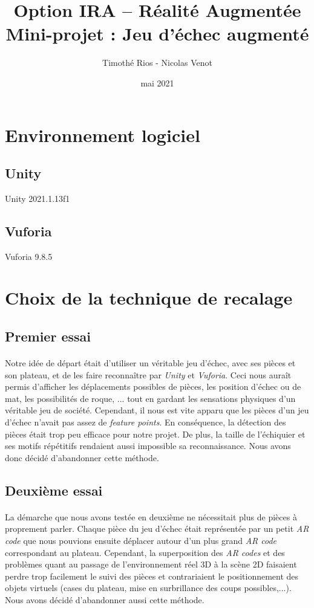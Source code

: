 \documentclass{article}
\title{Option IRA – Réalité Augmentée \\Mini-projet : Jeu d’échec augmenté}
\author{Timothé Rios - Nicolas Venot}
\date{mai 2021}
\begin{document}
\maketitle
\newpage
\tableofcontents
\newpage
 
\section{Environnement logiciel}
\subsection{Unity}
Unity 2021.1.13f1
\subsection{Vuforia}
Vuforia 9.8.5
\section{Choix de la technique de recalage}
\subsection{Premier essai}
\paragraph{} Notre idée de départ était d'utiliser un véritable jeu d'échec, avec ses pièces et son plateau, et de les faire reconnaître par \textit{Unity} et \textit{Vuforia}. Ceci nous auraît permis d'afficher les déplacements possibles de pièces, les position d'échec ou de mat, les possibilités de roque, ... tout en gardant les sensations physiques d'un véritable jeu de société.
Cependant, il nous est vite apparu que les pièces d'un jeu d'échec n'avait pas assez de \textit{feature points}. En conséquence, la détection des pièces était trop peu efficace pour notre projet. De plus, la taille de l'échiquier et ses motifs répétitifs rendaient aussi impossible sa reconnaissance.
Nous avons donc décidé d'abandonner cette méthode.
\subsection{Deuxième essai}
\paragraph{}La démarche que nous avons testée en deuxième ne nécessitait plus de pièces à proprement parler. Chaque pièce du jeu d'échec était représentée par un petit \textit{AR code} que nous pouvions ensuite déplacer autour d'un plus grand \textit{AR code} correspondant au plateau. Cependant, la superposition des \textit{AR codes} et des problèmes quant au passage de l'environnement réel 3D à la scène 2D faisaient perdre trop facilement le suivi des pièces et contrariaient le positionnement des objets virtuels (cases du plateau, mise en surbrillance des coups possibles,...).
Nous avons décidé d'abandonner aussi cette méthode. 
\end{document}
